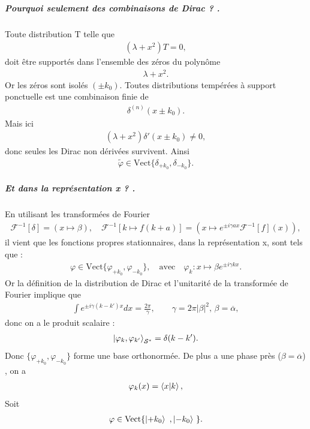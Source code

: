 \subparagraph{Pourquoi seulement des combinaisons de Dirac ? .}
Toute distribution $\mathrm T$ telle que 
\begin{eqnarray}
    (\lambda + x^2)T = 0,
\end{eqnarray}
doit être supportés dans l'ensemble des zéros du polynôme 
\begin{eqnarray}
    \lambda + x^2.
\end{eqnarray}
Or les zéros sont isolés $(\pm k_0)$. Toutes distributions tempérées à support ponctuelle est une combinaison finie de
\begin{eqnarray}
    \delta^{(n)}(x \pm  k_0).
\end{eqnarray}
Mais ici 
\begin{eqnarray}
    (\lambda + x^2)\delta'( x \pm k_0 ) \neq 0,
\end{eqnarray}  
donc seules les Dirac non dérivées survivent. Ainsi
\begin{eqnarray}
    \tilde \varphi \in \mathrm{Vect} \{ \delta_{+k_0} , \delta_{-k_0} \} .
\end{eqnarray} 

\subparagraph{Et dans la représentation \guillemotleft{}x\guillemotright{} ? .}

En utilisant les transformées de Fourier
\begin{eqnarray}
    \mathcal F^{-1}[\delta] = ( x \mapsto \beta ), \quad  \mathcal F^{-1}[k \mapsto f(k + a )] = (x \mapsto e^{\pm i \gamma a x } \mathcal F^{-1} [f] ( x )),
\end{eqnarray} 
il vient que les fonctions propres stationnaires, dans la représentation \guillemotleft{}x\guillemotright{}, sont tels que  :
\begin{eqnarray}
    \varphi \in \mathrm{Vect} \{ \varphi_{+k_0} , \varphi_{-k_0} \} , \quad \mbox{avec} \quad \varphi_{k} \colon x \mapsto \beta e^{\pm i \gamma k x } .
\end{eqnarray} 
Or la définition de la distribution de Dirac et l'unitarité de la transformée de Fourier implique que 
\begin{eqnarray}
    \int e^{\pm i \gamma ( k - k') x } dx = \frac{2\pi}\gamma , \qquad \gamma = 2 \pi \vert \beta \vert ^2 , \, \beta = \overline{\alpha},
\end{eqnarray}
donc on a le produit scalaire : 
\begin{eqnarray}
    \ket{\varphi_k ,  \varphi_{k'}}_{\mathcal S^\ast } = \delta( k - k' ).
\end{eqnarray}
Donc $\{ \varphi_{+k_0} , \varphi_{-k_0} \}$  forme une base orthonormée. De plus a une phase près ($\beta = \overline{\alpha}$) , on a
\begin{eqnarray}
    \varphi_k(x) = \braket{x \vert k }, 
\end{eqnarray}
Soit 
\begin{eqnarray}
    \varphi \in \mathrm{Vect} \{ \ket{+k_0} , \ket{-k_0} \}.
\end{eqnarray}

